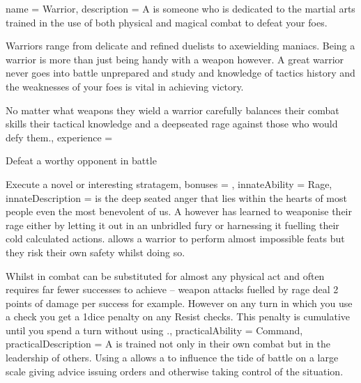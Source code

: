 \archetype
{
	name = Warrior,
	description = A \bname{} is someone who is dedicated to the martial arts\comma{} trained in the use of both physical and magical combat to defeat your foes. 

Warriors range from delicate and refined duelists\comma{} to axe\minus{}wielding maniacs. Being a warrior is more than just being handy with a weapon\comma{} however. A great warrior never goes into battle unprepared\comma{} and study and knowledge of tactics\comma{} history and the weaknesses of your foes is vital in achieving victory. 

No matter what weapons they wield\comma{} a warrior carefully balances their combat skills\comma{} their tactical knowledge and a deep\minus{}seated rage against those who would defy them.,
	experience = \item Defeat a worthy opponent in battle
\item Execute a novel or interesting stratagem,
	bonuses = 
,
	innateAbility = Rage,
	innateDescription =  is the deep seated anger that lies within the hearts of most people\comma{} even the most benevolent of us. A \bname{}\comma{} however\comma{} has learned to weaponise their rage\comma{} either by letting it out in an unbridled fury\comma{} or harnessing it\comma{} fuelling their cold\comma{} calculated actions.  allows a warrior to perform almost impossible feats\comma{} but they risk their own safety whilst doing so.

Whilst in combat\comma{}  can be substituted for almost any physical act\comma{} and often requires far fewer successes to achieve – weapon attacks fuelled by rage deal 2 points of damage per success\comma{} for example. However\comma{} on any turn in which you use a  check\comma{} you get a 1\minus{}dice penalty on any Resist checks. This penalty is cumulative until you spend a turn without using .,
	practicalAbility = Command,
	practicalDescription = A \bname{} is trained not only in their own combat\comma{} but in the leadership of others. Using a  allows a \bname{} to influence the tide of battle on a large scale\comma{} giving advice\comma{} issuing orders and otherwise taking control of the situation. 

}
